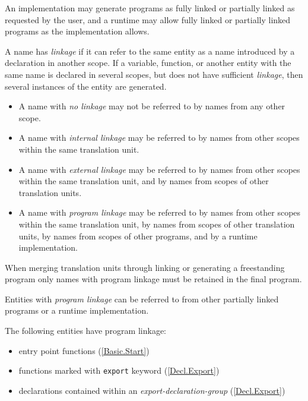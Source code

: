 \p An implementation may generate programs as fully linked or partially linked
as requested by the user, and a runtime may allow fully linked or partially
linked programs as the implementation allows.

\p A name has \textit{linkage} if it can refer to the same entity as a name
introduced by a declaration in another scope. If a variable, function, or
another entity with the same name is declared in several scopes, but does not
have sufficient \textit{linkage}, then several instances of the entity are
generated.

\begin{itemize}
\item A name with \textit{no linkage} may not be referred to by names from
any other scope.
\item A name with \textit{internal linkage} may be referred to by names
from other scopes within the same translation unit.
\item A name with \textit{external linkage} may be referred to by names from
other scopes within the same translation unit, and by names from scopes of other
translation units.
\item A name with \textit{program linkage} may be referred to by names from
other scopes within the same translation unit, by names from scopes of other
translation units, by names from scopes of other programs, and by a runtime
implementation.
\end{itemize}

\p When merging translation units through linking or generating a freestanding
program only names with program linkage must be retained in the final program.


\p Entities with \textit{program linkage} can be referred to from other
partially linked programs or a runtime implementation.

\p The following entities have program linkage:
\begin{itemize}
  \item entry point functions (\ref{Basic.Start})
  \item functions marked with \texttt{export} keyword (\ref{Decl.Export})
  \item declarations contained within an \textit{export-declaration-group} (\ref{Decl.Export})
\end{itemize}


